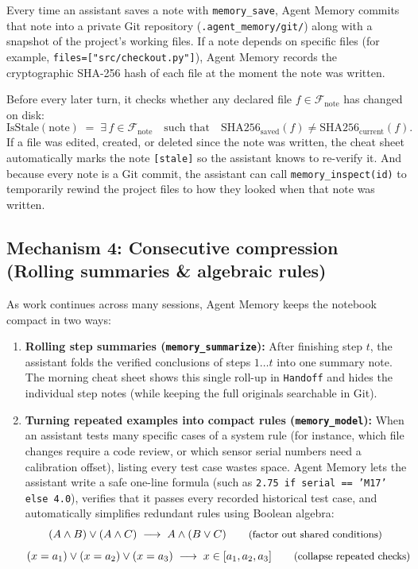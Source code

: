 \documentclass[11pt,a4paper]{article}
\begin{document}
Every time an assistant saves a note with \texttt{memory\_save}, Agent Memory commits that note into a private Git repository (\texttt{.agent\_memory/git/}) along with a snapshot of the project's working files. If a note depends on specific files (for example, \texttt{files=["src/checkout.py"]}), Agent Memory records the cryptographic SHA-256 hash of each file at the moment the note was written.

Before every later turn, it checks whether any declared file $f \in \mathcal{F}_{\text{note}}$ has changed on disk:
\[
  \text{IsStale}(\text{note}) \;=\; \exists\, f \in \mathcal{F}_{\text{note}} \quad\text{such that}\quad \text{SHA256}_{\text{saved}}(f) \neq \text{SHA256}_{\text{current}}(f).
\]
If a file was edited, created, or deleted since the note was written, the cheat sheet automatically marks the note \texttt{[stale]} so the assistant knows to re-verify it. And because every note is a Git commit, the assistant can call \texttt{memory\_inspect(id)} to temporarily rewind the project files to how they looked when that note was written.

\subsection{Mechanism 4: Consecutive compression (Rolling summaries \& algebraic rules)}

As work continues across many sessions, Agent Memory keeps the notebook compact in two ways:
\begin{enumerate}[leftmargin=1.5em,itemsep=2pt]
  \item \textbf{Rolling step summaries (\texttt{memory\_summarize}):} After finishing step $t$, the assistant folds the verified conclusions of steps $1\dots t$ into one summary note. The morning cheat sheet shows this single roll-up in \texttt{Handoff} and hides the individual step notes (while keeping the full originals searchable in Git).
  \item \textbf{Turning repeated examples into compact rules (\texttt{memory\_model}):} When an assistant tests many specific cases of a system rule (for instance, which file changes require a code review, or which sensor serial numbers need a calibration offset), listing every test case wastes space. Agent Memory lets the assistant write a safe one-line formula (such as \texttt{2.75 if serial == 'M17' else 4.0}), verifies that it passes every recorded historical test case, and automatically simplifies redundant rules using Boolean algebra:
  \[
    (A \wedge B) \vee (A \wedge C) \;\longrightarrow\; A \wedge (B \vee C) \qquad\text{\small(factor out shared conditions)}
  \]
  \[
    (x = a_1) \vee (x = a_2) \vee (x = a_3) \;\longrightarrow\; x \in [a_1, a_2, a_3] \qquad\text{\small(collapse repeated checks)}
  \]
\end{enumerate}
\end{document}
